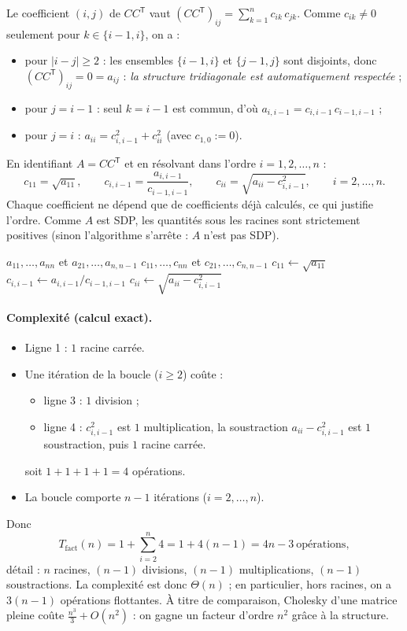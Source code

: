 \documentclass[11pt,a4paper]{article}
\newcommand{\T}{\mathsf{T}}
\begin{document}
Le coefficient $(i,j)$ de $CC^\T$ vaut $\displaystyle (CC^\T)_{ij}=\sum_{k=1}^{n}c_{ik}\,c_{jk}$.
Comme $c_{ik}\neq0$ seulement pour $k\in\{i-1,i\}$, on a :
\begin{itemize}
\item pour $|i-j|\ge2$ : les ensembles $\{i-1,i\}$ et $\{j-1,j\}$ sont disjoints,
donc $(CC^\T)_{ij}=0=a_{ij}$ : \emph{la structure tridiagonale est automatiquement respectée} ;
\item pour $j=i-1$ : seul $k=i-1$ est commun, d'où $a_{i,i-1}=c_{i,i-1}\,c_{i-1,i-1}$ ;
\item pour $j=i$ : $a_{ii}=c_{i,i-1}^2+c_{ii}^2$ (avec $c_{1,0}:=0$).
\end{itemize}
En identifiant $A=CC^\T$ et en résolvant dans l'ordre $i=1,2,\dots,n$ :
\[
\boxed{\;c_{11}=\sqrt{a_{11}},\qquad
c_{i,i-1}=\frac{a_{i,i-1}}{c_{i-1,i-1}},\qquad
c_{ii}=\sqrt{a_{ii}-c_{i,i-1}^2},\qquad i=2,\dots,n.\;}
\]
Chaque coefficient ne dépend que de coefficients déjà calculés, ce qui justifie l'ordre.
Comme $A$ est SDP, les quantités sous les racines sont strictement positives
(sinon l'algorithme s'arrête : $A$ n'est pas SDP).

\begin{algorithm}[h]
\caption{Cholesky tridiagonal $A=CC^\T$}
\begin{algorithmic}[1]
\Require $a_{11},\dots,a_{nn}$ et $a_{21},\dots,a_{n,n-1}$
\Ensure $c_{11},\dots,c_{nn}$ et $c_{21},\dots,c_{n,n-1}$
\State $c_{11}\gets\sqrt{a_{11}}$
  \State $c_{i,i-1}\gets a_{i,i-1}/c_{i-1,i-1}$
  \State $c_{ii}\gets\sqrt{a_{ii}-c_{i,i-1}^2}$
\EndFor
\end{algorithmic}
\end{algorithm}

\paragraph{Complexité (calcul exact).}
\begin{itemize}
\item Ligne 1 : $1$ racine carrée.
\item Une itération de la boucle ($i\ge2$) coûte :
 \begin{itemize}
 \item ligne 3 : $1$ division ;
 \item ligne 4 : $c_{i,i-1}^2$ est $1$ multiplication, la soustraction $a_{ii}-c_{i,i-1}^2$ est $1$ soustraction,
 puis $1$ racine carrée.
 \end{itemize}
 soit $1+1+1+1=4$ opérations.
\item La boucle comporte $n-1$ itérations ($i=2,\dots,n$).
\end{itemize}
Donc
\[
T_{\mathrm{fact}}(n)=1+\sum_{i=2}^{n}4=1+4(n-1)=\boxed{4n-3}\ \text{opérations},
\]
détail : $n$ racines, $(n-1)$ divisions, $(n-1)$ multiplications, $(n-1)$ soustractions.
La complexité est donc $\Theta(n)$ ; en particulier, hors racines, on a $3(n-1)$ opérations flottantes.
À titre de comparaison, Cholesky d'une matrice pleine coûte $\frac{n^3}{3}+O(n^2)$ :
on gagne un facteur d'ordre $n^2$ grâce à la structure.
\end{document}
